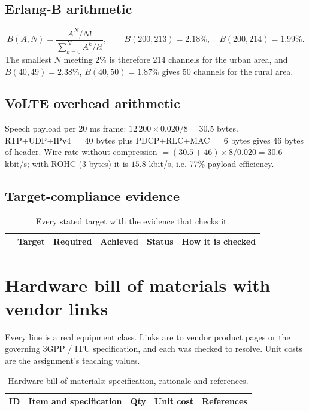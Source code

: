 \documentclass[9pt,a4paper]{article}
\begin{document}
\subsection{Erlang-B arithmetic}
\[
B(A,N) = \frac{A^N/N!}{\sum_{k=0}^{N} A^k/k!},\qquad
B(200,213) = 2.18\%,\quad B(200,214) = 1.99\%.
\]
The smallest $N$ meeting 2\% is therefore 214 channels for the urban area, and
$B(40,49)=2.38\%$, $B(40,50)=1.87\%$ gives 50 channels for the rural area.

\subsection{VoLTE overhead arithmetic}
Speech payload per 20 ms frame: $12\,200\times0.020/8 = 30.5$ bytes. RTP+UDP+IPv4 $=40$ bytes
plus PDCP+RLC+MAC $=6$ bytes gives 46 bytes of header. Wire rate without compression
$=(30.5+46)\times8/0.020=30.6$ kbit/s; with ROHC (3 bytes) it is $15.8$ kbit/s, i.e. 77\% payload
efficiency.

\subsection{Target-compliance evidence}
\begin{table}[H]\centering\footnotesize
\caption{Every stated target with the evidence that checks it.}
\label{tab:compliance}
\begin{tabularx}{\textwidth}{@{}p{0.6cm}p{4.0cm}p{2.2cm}p{3.0cm}p{0.9cm}X@{}}
\toprule
& \textbf{Target} & \textbf{Required} & \textbf{Achieved} & \textbf{Status} & \textbf{How it is checked} \\
\midrule
\bottomrule
\end{tabularx}
\end{table}

\section{Hardware bill of materials with vendor links}
\label{app:bom}
Every line is a real equipment class. Links are to vendor product pages or the governing 3GPP / ITU
specification, and each was checked to resolve. Unit costs are the assignment's teaching values.

\begin{table}[H]\centering\footnotesize
\caption{Hardware bill of materials: specification, rationale and references.}
\begin{tabularx}{\textwidth}{@{}p{0.65cm}p{5.8cm}cp{1.35cm}p{4.3cm}@{}}
\toprule
\textbf{ID} & \textbf{Item and specification} & \textbf{Qty} & \textbf{Unit cost} & \textbf{References} \\
\midrule
\bottomrule
\end{tabularx}
\end{table}
\end{document}
